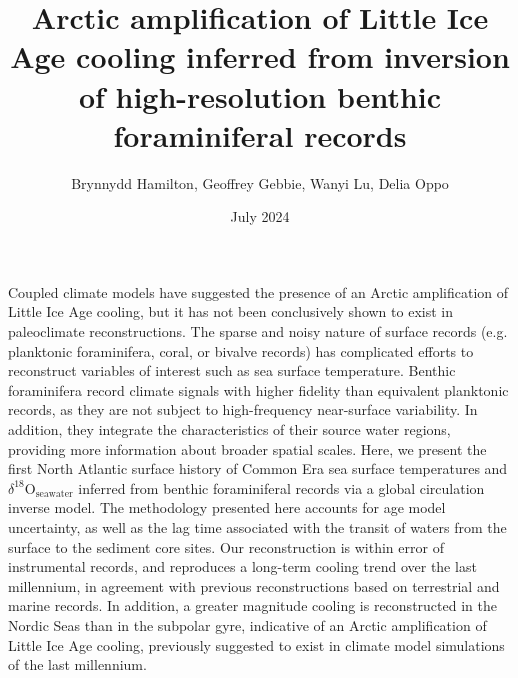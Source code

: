 \documentclass{article}
\title{Arctic amplification of Little Ice Age cooling inferred from inversion of high-resolution benthic foraminiferal records}
\author{Brynnydd Hamilton, Geoffrey Gebbie, Wanyi Lu, Delia Oppo}
\date{July 2024}
\begin{document}
\maketitle
Coupled climate models have suggested the presence of an Arctic amplification of Little Ice Age cooling, but it has not been conclusively shown to exist in paleoclimate reconstructions. The sparse and noisy nature of surface records (e.g. planktonic foraminifera, coral, or bivalve records) has complicated efforts to reconstruct variables of interest such as sea surface temperature. Benthic foraminifera record climate signals with higher fidelity than equivalent planktonic records, as they are not subject to high-frequency near-surface variability. In addition, they integrate the characteristics of their source water regions, providing more information about broader spatial scales. 
Here, we present the first North Atlantic surface history of Common Era sea surface temperatures and $\delta^{18}\mathrm{O}_{\mathrm{seawater}}$ inferred from benthic foraminiferal records via a global circulation inverse model. 
The methodology presented here accounts for age model uncertainty, as well as the lag time associated with the transit of waters from the surface to the sediment core sites.
Our reconstruction is within error of instrumental records, and reproduces a long-term cooling trend over the last millennium, in agreement with previous reconstructions based on terrestrial and marine records. In addition, a greater magnitude cooling is reconstructed in the Nordic Seas than in the subpolar gyre, indicative of an Arctic amplification of Little Ice Age cooling, previously suggested to exist in climate model simulations of the last millennium.
\end{document}
